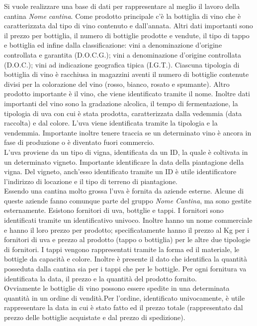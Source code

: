 Si vuole realizzare una base di dati per rappresentare al meglio il lavoro della cantina \emph{Nome cantina}. Come prodotto principale c'è la bottiglia di vino che è caratterizzata dal tipo di vino contenuto e dall'annata. Altri dati importanti sono il prezzo per bottiglia, il numero di bottiglie prodotte e vendute, il tipo di tappo e bottiglia ed infine dalla classificazione: vini a denominazione d'origine controllata e garantita (D.O.C.G.); vini a denominazione d'origine controllata (D.O.C.); vini ad indicazione geografica tipica (I.G.T.). Ciascuna tipologia di bottiglia di vino è racchiusa in magazzini aventi il numero di bottiglie contenute divisi per la colorazione del vino (rosso, bianco, rosato e spumante).
Altro prodotto importante è il vino, che viene identificato tramite il nome. Inoltre dati importanti del vino sono la gradazione alcolica, il tempo di fermentazione, la tipologia di uva con cui è stata prodotta, caratterizzata dalla vedemmia (data raccolta) e dal colore. L'uva viene identificata tramite la tipologia e la vendemmia. Importante inoltre tenere traccia se un determinato vino è ancora in fase di produzione o è diventato fuori commercio.\\
L'uva proviene da un tipo di vigna, identificata da un ID, la quale è coltivata in un determinato vigneto. Importante identificare la data della piantagione della vigna. Del vigneto, anch'esso identificato tramite un ID è utile identificatore l'indirizzo di locazione e il tipo di terreno di piantagione.\\
Essendo una cantina molto grossa l'uva è fornita da aziende esterne. Alcune di queste aziende fanno comunque parte del gruppo \emph{Nome Cantina}, ma sono gestite esternamente. Esistono fornitori di uva, bottglie e tappi.
I fornitori sono identificati tramite un identificativo univoco. Inoltre hanno un nome commerciale e hanno il loro prezzo per prodotto; specificatamente hanno il prezzo al Kg per i fornitori di uva e prezzo al prodotto (tappo o bottiglia) per le altre due tipologie di fornitori.
I tappi vengono rappresentati tramite la forma ed il materiale, le bottigle da capacità e colore. Inoltre è presente il dato che identifica la quantità posseduta dalla cantina sia per i tappi che per le bottigle. Per ogni fornitura va identificata la data, il prezzo e la quantità del prodotto fornito.\\
Ovviamente le bottiglie di vino possono essere spedite in una determinata quantità in un ordine di vendità.Per l'ordine, identificato univocamente, è utile rappresentare la data in cui è stato fatto ed il prezzo totale (rappresentato dal prezzo delle bottiglie acquistate e dal prezzo di spedizione).\\
